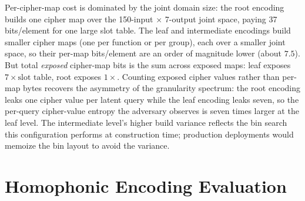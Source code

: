 \documentclass[conference]{IEEEtran}
\theoremstyle{definition}
\theoremstyle{plain}
\theoremstyle{remark}
\begin{document}
\begin{table}[ht]
\centering
\caption{Encoding granularity spectrum for a 7-function decision
pipeline (mean $\pm$ std over $n$ seeds; intermediate level has
$n=2$ successful runs because of construction failures at this
domain size on three of five seeds).  Bits/elem measures the
\emph{per-cipher-map} slot table cost; total exposed bits per
latent input is roughly bits/elem $\times$ exposed.}
\label{tab:granularity}
\end{table}

Per-cipher-map cost is dominated by the joint domain size: the root
encoding builds one cipher map over the 150-input $\times$ 7-output
joint space, paying 37 bits/element for one large slot table.  The
leaf and intermediate encodings build smaller cipher maps (one per
function or per group), each over a smaller joint space, so their
per-map bits/element are an order of magnitude lower (about
$7.5$).  But total \emph{exposed} cipher-map bits is the sum across
exposed maps: leaf exposes $7 \times \text{slot table}$, root
exposes $1 \times$.  Counting exposed cipher values rather than
per-map bytes recovers the asymmetry of the granularity spectrum:
the root encoding leaks one cipher value per latent query while the
leaf encoding leaks seven, so the per-query cipher-value entropy
the adversary observes is seven times larger at the leaf level.
The intermediate level's higher build variance reflects the bin
search this configuration performs at construction time; production
deployments would memoize the bin layout to avoid the variance.



\section{Homophonic Encoding Evaluation}
\label{app:homexp}
\label{subsec:newsgroups-homophonic}
\end{document}
